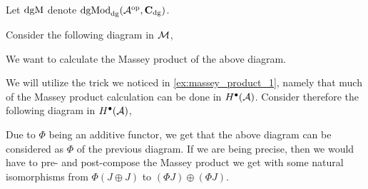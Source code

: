 \begin{example}
    Let \( \operatorname{dgM} \) denote \( \operatorname{dgMod}_{\operatorname{dg}}({\mathcal{A}}^{\operatorname{op}}, \operatorname{\mathbf{C}}_{\operatorname{dg}}) \).

    Consider the following diagram in \( {\mathcal{M}} \),
    \begin{center}
	\end{center}

    We want to calculate the Massey product of the above diagram.

    We will utilize the trick we noticed in \autoref{ex:massey_product_1}, namely that much of the Massey product calculation can be done in \( H^{\bullet}({\mathcal{A}}) \). Consider therefore the following diagram in \( H^{\bullet}({\mathcal{A}}) \),
    \begin{center}
	\end{center}
    Due to \( \Phi \) being an additive functor, we get that the above diagram can be considered as \( \Phi \) of the previous diagram. If we are being precise, then we would have to pre- and post-compose the Massey product we get with some natural isomorphisms from \( \Phi (J \oplus J) \) to \( (\Phi J) \oplus (\Phi J) \).


\end{example}
